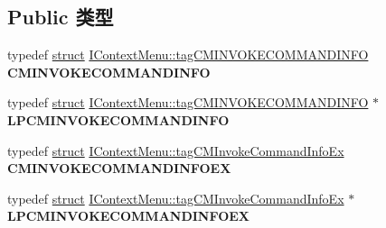 \subsection*{Public 类型}
\begin{DoxyCompactItemize}
\item 
\mbox{\label{interface_i_context_menu_af5b0485b98f5aa5f48838427a8549239}} 
typedef \hyperlink{interfacestruct}{struct} \hyperlink{struct_i_context_menu_1_1tag_c_m_i_n_v_o_k_e_c_o_m_m_a_n_d_i_n_f_o}{I\+Context\+Menu\+::tag\+C\+M\+I\+N\+V\+O\+K\+E\+C\+O\+M\+M\+A\+N\+D\+I\+N\+FO} {\bfseries C\+M\+I\+N\+V\+O\+K\+E\+C\+O\+M\+M\+A\+N\+D\+I\+N\+FO}
\item 
\mbox{\label{interface_i_context_menu_a43ee40716115fdd69ecd70fdfe978e97}} 
typedef \hyperlink{interfacestruct}{struct} \hyperlink{struct_i_context_menu_1_1tag_c_m_i_n_v_o_k_e_c_o_m_m_a_n_d_i_n_f_o}{I\+Context\+Menu\+::tag\+C\+M\+I\+N\+V\+O\+K\+E\+C\+O\+M\+M\+A\+N\+D\+I\+N\+FO} $\ast$ {\bfseries L\+P\+C\+M\+I\+N\+V\+O\+K\+E\+C\+O\+M\+M\+A\+N\+D\+I\+N\+FO}
\item 
\mbox{\label{interface_i_context_menu_a2ee3f5d04e9ba33d0bb45db28868a7fd}} 
typedef \hyperlink{interfacestruct}{struct} \hyperlink{struct_i_context_menu_1_1tag_c_m_invoke_command_info_ex}{I\+Context\+Menu\+::tag\+C\+M\+Invoke\+Command\+Info\+Ex} {\bfseries C\+M\+I\+N\+V\+O\+K\+E\+C\+O\+M\+M\+A\+N\+D\+I\+N\+F\+O\+EX}
\item 
\mbox{\label{interface_i_context_menu_a04fce6a5608af9351b01e90f42a35b2f}} 
typedef \hyperlink{interfacestruct}{struct} \hyperlink{struct_i_context_menu_1_1tag_c_m_invoke_command_info_ex}{I\+Context\+Menu\+::tag\+C\+M\+Invoke\+Command\+Info\+Ex} $\ast$ {\bfseries L\+P\+C\+M\+I\+N\+V\+O\+K\+E\+C\+O\+M\+M\+A\+N\+D\+I\+N\+F\+O\+EX}
\end{DoxyCompactItemize}
